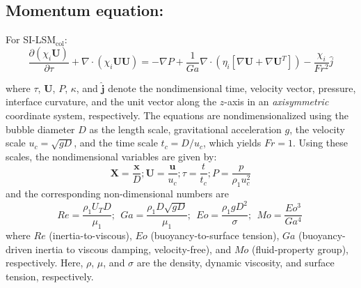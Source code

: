 \documentclass[aps,prfluids,reprint,nofootinbib,onecolumn,groupedaddress,showkeys]{revtex4-2}
\begin{document}
	\subsection*{Momentum equation:}
	\noindent For SI-LSM$_{\text{col}}$:
	\begin{equation}\label{eqt:momEqt-SI}
		\frac{\partial(\chi_{i}\mathbf{U})}{\partial\tau}+\nabla\cdot(\chi_{i}\mathbf{U}\mathbf{U})=-\nabla P+\frac{1}{Ga}\nabla\cdot(\eta_{i}[\nabla\mathbf{U}+\nabla\mathbf{U}^T])-\frac{\chi_{i}}{Fr^2}\hat{j}
	\end{equation}
	
	\noindent where $\tau$, $\mathbf{U}$, $P$, $\kappa$, and $\hat{\mathbf{j}}$ denote the nondimensional time, velocity vector, pressure, interface curvature, and the unit vector along the $z$-axis in an \textit{axisymmetric} coordinate system, respectively. The equations are nondimensionalized using the bubble diameter $D$ as the length scale, gravitational acceleration $g$, the velocity scale $u_c=\sqrt{gD}$, and the time scale $t_c=D/u_c$, which yields $Fr=1$. Using these scales, the nondimensional variables are given by:
	\begin{equation*}
		\mathbf{X}=\frac{\mathbf{x}}{D}; \mathbf{U}=\frac{\mathbf{u}}{u_c}; \tau=\frac{t}{t_c}; P=\frac{p}{\rho_1u_c^2}
	\end{equation*}
	and the corresponding non-dimensional numbers are
	\begin{equation*}
		Re = \frac{\rho_1 U_T D}{\mu_1};~~ Ga=\frac{\rho_1 D \sqrt{gD}}{\mu_1};~~ Eo=\frac{\rho_1g D^2}{\sigma};~~ Mo = \frac{Eo^3}{Ga^4} \ 
	\end{equation*}
	where $Re$ (inertia-to-viscous), $Eo$ (buoyancy-to-surface tension), $Ga$ (buoyancy-driven inertia to viscous damping, velocity-free), and $Mo$ (fluid-property group), respectively. Here, $\rho$, $\mu$, and $\sigma$ are the density, dynamic viscosity, and surface tension, respectively. 
	
\end{document}
